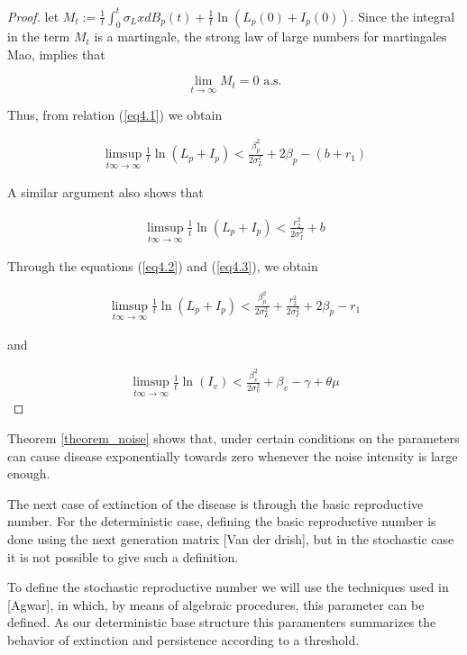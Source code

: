 \begin{proof}
	let $M_t :=\frac{1}{t}\int_{0}^{t}\sigma_L xdB_p(t)+\frac{1}{t}\ln(L_p(0)+I_p(0))$. Since the integral in the term $M_t$ is a martingale, the strong law of large numbers for martingales Mao, implies that 
	
	\begin{equation*}
		\lim\limits_{t \rightarrow \infty}M_t = 0\,\,\mbox{a.s.}
	\end{equation*}
	
	Thus, from relation (\ref{eq4.1}) we obtain
	
	\begin{align}\label{eq4.2}
		\limsup_{t\infty \rightarrow \infty}\frac{1}{t}\ln(L_p+I_p)<\frac{\beta_p^2}{2\sigma_L^2}+	2\beta_p-(b+r_1)
	\end{align}
	
	A similar argument also shows that
	
	\begin{align}\label{eq4.3}
		\limsup_{t\infty \rightarrow \infty}\frac{1}{t}\ln(L_p+I_p)<\frac{r_2^2}{2\sigma_I^2}+b
	\end{align}
	
	Through the equations (\ref{eq4.2}) and (\ref{eq4.3}), we obtain
	
	\begin{align*}
		\limsup_{t\infty \rightarrow \infty}\frac{1}{t}\ln(L_p+I_p)<\frac{\beta_p^2}{2\sigma_L^2}+\frac{r_2^2}{2\sigma_I^2}+	2\beta_p-r_1
	\end{align*}
	
	and 
	
	\begin{align*}
		\limsup_{t\infty \rightarrow \infty}\frac{1}{t}\ln(I_v)<\frac{\beta_v^2}{2\sigma_v^2}+\beta_v-\gamma+\theta\mu
	\end{align*}
\end{proof}

\begin{remark}
	Theorem \ref{theorem_noise} shows that, under certain conditions on the parameters can cause disease exponentially towards zero whenever the noise intensity is large enough.
\end{remark}

The next case of extinction of the disease is through the basic reproductive number. For the deterministic case, defining the basic reproductive number is done using the next generation matrix [Van der drish], but in the stochastic case it is not possible to give such a definition.

To define the stochastic reproductive number we will use the techniques used in [Agwar], in which, by means of algebraic procedures, this parameter can be defined. As our deterministic base structure this paramenters summarizes the behavior of extinction and persistence according to a threshold.

